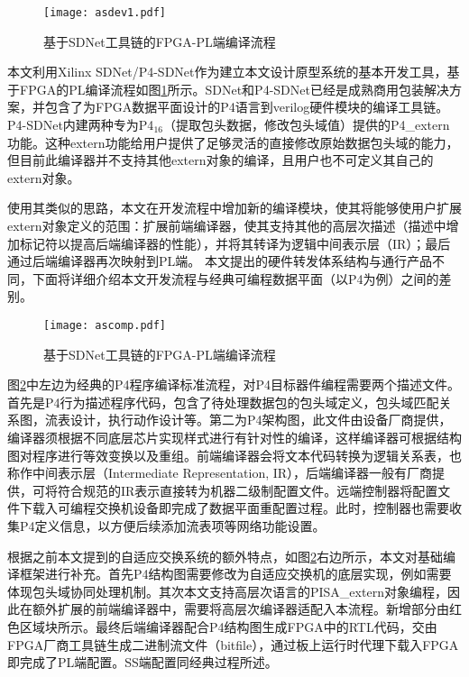\begin{figure}[!ht]
	\centering 
	\texttt{[image: asdev1.pdf]}
	\caption{基于SDNet工具链的FPGA-PL端编译流程} \label{fig:asdev}
\end{figure}

本文利用Xilinx SDNet/P4-SDNet作为建立本文设计原型系统的基本开发工具，基于FPGA的PL编译流程如图\ref{fig:asdev}所示。SDNet和P4-SDNet已经是成熟商用包装解决方案，并包含了为FPGA数据平面设计的P4语言到verilog硬件模块的编译工具链。P4-SDNet内建两种专为P4$ _{16} $（提取包头数据，修改包头域值）提供的P4\_extern功能。这种extern功能给用户提供了足够灵活的直接修改原始数据包头域的能力，但目前此编译器并不支持其他extern对象的编译，且用户也不可定义其自己的extern对象。

使用其类似的思路，本文在开发流程中增加新的编译模块，使其将能够使用户扩展extern对象定义的范围：扩展前端编译器，使其支持其他的高层次描述（描述中增加标记符以提高后端编译器的性能），并将其转译为逻辑中间表示层（IR）；最后通过后端编译器再次映射到PL端。
本文提出的硬件转发体系结构与通行产品不同，下面将详细介绍本文开发流程与经典可编程数据平面（以P4为例）之间的差别。

\begin{figure}[!ht]
	\centering 
	\texttt{[image: ascomp.pdf]}
	\caption{基于SDNet工具链的FPGA-PL端编译流程} \label{fig:ascomp}
\end{figure}

图\ref{fig:ascomp}中左边为经典的P4程序编译标准流程，对P4目标器件编程需要两个描述文件。首先是P4行为描述程序代码，包含了待处理数据包的包头域定义，包头域匹配关系图，流表设计，执行动作设计等。第二为P4架构图，此文件由设备厂商提供，编译器须根据不同底层芯片实现样式进行有针对性的编译，这样编译器可根据结构图对程序进行等效变换以及重组。前端编译器会将文本代码转换为逻辑关系表，也称作中间表示层（Intermediate Representation, IR），后端编译器一般有厂商提供，可将符合规范的IR表示直接转为机器二级制配置文件。远端控制器将配置文件下载入可编程交换机设备即完成了数据平面重配置过程。此时，控制器也需要收集P4定义信息，以方便后续添加流表项等网络功能设置。

根据之前本文提到的自适应交换系统的额外特点，如图\ref{fig:ascomp}右边所示，本文对基础编译框架进行补充。首先P4结构图需要修改为自适应交换机的底层实现，例如需要体现包头域协同处理机制。其次本文支持高层次语言的PISA\_extern对象编程，因此在额外扩展的前端编译器中，需要将高层次编译器适配入本流程。新增部分由红色区域块所示。最终后端编译器配合P4结构图生成FPGA中的RTL代码，交由FPGA厂商工具链生成二进制流文件（bitfile），通过板上运行时代理下载入FPGA即完成了PL端配置。SS端配置同经典过程所述。


